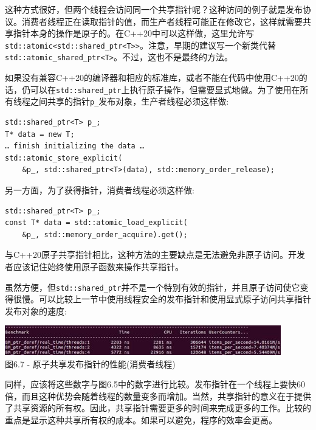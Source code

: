 这种方式很好，但两个线程会访问同一个共享指针呢？这种访问的例子就是发布协议。消费者线程正在读取指针的值，而生产者线程可能正在修改它，这样就需要共享指针本身的操作是原子的。在C++20中可以这样做，这里允许写\texttt{std::atomic<std::shared\_ptr<T>>}。注意，早期的建议写一个新类代替\texttt{std::atomic\_shared\_ptr<T>}。不过，这也不是最终的方法。

如果没有兼容C++20的编译器和相应的标准库，或者不能在代码中使用C++20的话，仍可以在\texttt{std::shared\_ptr}上执行原子操作，但需要显式地做。为了使用在所有线程之间共享的指针\texttt{p\_}发布对象，生产者线程必须这样做:

\begin{lstlisting}[style=styleCXX]
std::shared_ptr<T> p_;
T* data = new T;
… finish initializing the data …
std::atomic_store_explicit(
	&p_, std::shared_ptr<T>(data), std::memory_order_release);
\end{lstlisting}

另一方面，为了获得指针，消费者线程必须这样做:

\begin{lstlisting}[style=styleCXX]
std::shared_ptr<T> p_;
const T* data = std::atomic_load_explicit(
	&p_, std::memory_order_acquire).get();
\end{lstlisting}

与C++20原子共享指针相比，这种方法的主要缺点是无法避免非原子访问。开发者应该记住始终使用原子函数来操作共享指针。

虽然方便，但\texttt{std::shared\_ptr}并不是一个特别有效的指针，并且原子访问使它变得很慢。可以比较上一节中使用线程安全的发布指针和使用显式原子访问共享指针发布对象的速度:

\begin{center}
\includegraphics[width=0.9\textwidth]{content/2/chapter6/images/7.jpg}\\
图6.7 - 原子共享发布指针的性能(消费者线程)
\end{center}

同样，应该将这些数字与图6.5中的数字进行比较。发布指针在一个线程上要快60倍，而且这种优势会随着线程的数量变多而增加。当然，共享指针的意义在于提供了共享资源的所有权。因此，共享指针需要更多的时间来完成更多的工作。比较的重点是显示这种共享所有权的成本。如果可以避免，程序的效率会更高。

